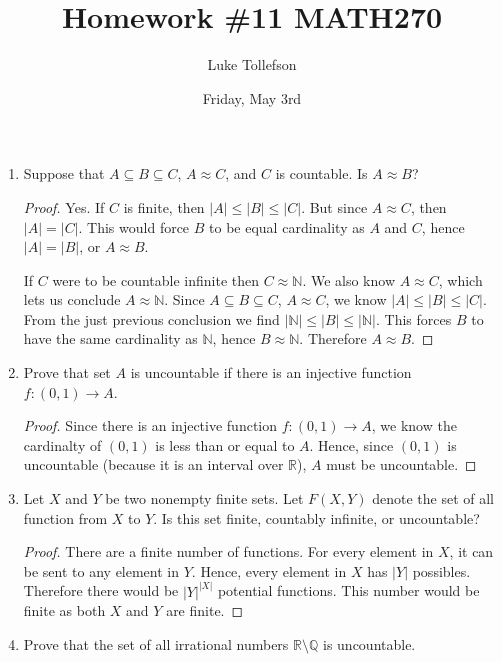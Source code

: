 \documentclass[11pt]{article}
\begin{document}
	
	\title{\Large Homework \#11 MATH270}
	\author{Luke Tollefson}
	\date{Friday, May 3rd}
	
	\maketitle
	\begin{enumerate}
		\item Suppose that $A\subseteq B\subseteq C$, $A\approx C$, and $C$ is countable. Is $A\approx B$?
		
		\begin{proof}
			Yes. If $C$ is finite, then $|A|\leq |B|\leq |C|$. But since $A\approx C$, then $|A|=|C|$. This would force $B$ to be equal cardinality as $A$ and $C$, hence $|A|=|B|$, or $A\approx B$.
			
			If $C$ were to be countable infinite then $C\approx \mathbb{N}$. We also know $A\approx C$, which lets us conclude $A\approx \mathbb{N}$. Since $A\subseteq B\subseteq C$, $A\approx C$, we know $|A|\leq |B|\leq |C|$. From the just previous conclusion we find $|\mathbb{N}|\leq |B|\leq |\mathbb{N}|$. This forces $B$ to have the same cardinality as $\mathbb{N}$, hence $B\approx \mathbb{N}$. Therefore $A\approx B$.
		\end{proof}
	
		\item Prove that set $A$ is uncountable if there is an injective function $f:(0,1)\to A$.
		
		\begin{proof}
			Since there is an injective function $f:(0,1)\to A$, we know the cardinalty of $(0,1)$ is less than or equal to $A$. Hence, since $(0,1)$ is uncountable (because it is an interval over $\mathbb{R}$), $A$ must be uncountable.
		\end{proof}
	
		\item Let $X$ and $Y$ be two nonempty finite sets. Let $F(X,Y)$ denote the set of all function from $X$ to $Y$. Is this set finite, countably infinite, or uncountable?
		
		\begin{proof}
			There are a finite number of functions. For every element in $X$, it can be sent to any element in $Y$. Hence, every element in $X$ has $|Y|$ possibles. Therefore there would be $|Y|^{|X|}$ potential functions. This number would be finite as both $X$ and $Y$ are finite.
		\end{proof}
	
		\item Prove that the set of all irrational numbers $\mathbb{R}\setminus \mathbb{Q}$ is uncountable.
		

\end{enumerate}
\end{document}
